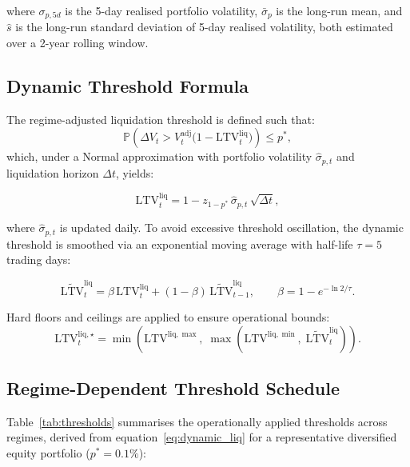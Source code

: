 \documentclass[12pt, a4paper]{article}
\newcommand{\LTV}{\mathrm{LTV}}
\newcommand{\Prob}{\mathbb{P}}
\newcommand{\1}{\mathbbm{1}}
\begin{document}
\noindent where $\sigma_{p,5d}$ is the 5-day realised portfolio volatility,
$\bar{\sigma}_p$ is the long-run mean, and $\hat{s}$ is the long-run standard
deviation of 5-day realised volatility, both estimated over a 2-year rolling window.

\subsection{Dynamic Threshold Formula}

The regime-adjusted liquidation threshold is defined such that:
\begin{equation}
    \Prob\!\left(\Delta V_t > V_t^{\mathrm{adj}}\bigl(1 - \LTV^{\mathrm{liq}}_t\bigr)\right) \leq p^*,
    \label{eq:threshold_condition}
\end{equation}
which, under a Normal approximation with portfolio volatility $\hat{\sigma}_{p,t}$
and liquidation horizon $\Delta t$, yields:

\begin{equation}
    \LTV^{\mathrm{liq}}_t = 1 - z_{1-p^*}\,\hat{\sigma}_{p,t}\,\sqrt{\Delta t},
    \label{eq:dynamic_liq}
\end{equation}

where $\hat{\sigma}_{p,t}$ is updated daily. To avoid excessive threshold
oscillation, the dynamic threshold is smoothed via an exponential moving average
with half-life $\tau = 5$ trading days:

\begin{equation}
    \widetilde{\LTV}^{\mathrm{liq}}_t
    = \beta\,\LTV^{\mathrm{liq}}_t + (1-\beta)\,\widetilde{\LTV}^{\mathrm{liq}}_{t-1},
    \qquad \beta = 1 - e^{-\ln 2 / \tau}.
    \label{eq:threshold_smooth}
\end{equation}

Hard floors and ceilings are applied to ensure operational bounds:
\begin{equation}
    \LTV^{\mathrm{liq},\star}_t
    = \min\!\left(\LTV^{\mathrm{liq},\max},\;
    \max\!\left(\LTV^{\mathrm{liq},\min},\;
    \widetilde{\LTV}^{\mathrm{liq}}_t\right)\right).
    \label{eq:threshold_bounds}
\end{equation}

\subsection{Regime-Dependent Threshold Schedule}

Table~\ref{tab:thresholds} summarises the operationally applied thresholds across
regimes, derived from equation~\eqref{eq:dynamic_liq} for a representative
diversified equity portfolio ($p^* = 0.1\%$):
\end{document}
